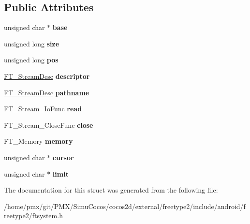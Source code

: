 \subsection*{Public Attributes}
\begin{DoxyCompactItemize}
\item 
\mbox{\label{structFT__StreamRec___a1ed28cf0a94f6cd68ac70b878c5d1e5b}} 
unsigned char $\ast$ {\bfseries base}
\item 
\mbox{\label{structFT__StreamRec___ab00e3cf802c950d0ca5a022a06953123}} 
unsigned long {\bfseries size}
\item 
\mbox{\label{structFT__StreamRec___a5bf82c2ff4554752edfeec442fba2f33}} 
unsigned long {\bfseries pos}
\item 
\mbox{\label{structFT__StreamRec___a361c44020eace21cc453b51852d8cc4f}} 
\hyperlink{unionFT__StreamDesc__}{F\+T\+\_\+\+Stream\+Desc} {\bfseries descriptor}
\item 
\mbox{\label{structFT__StreamRec___afd75c5de5ed78c484a200a7e97ef5a41}} 
\hyperlink{unionFT__StreamDesc__}{F\+T\+\_\+\+Stream\+Desc} {\bfseries pathname}
\item 
\mbox{\label{structFT__StreamRec___af724049d0258d4988c2b11c3a08b1b05}} 
F\+T\+\_\+\+Stream\+\_\+\+Io\+Func {\bfseries read}
\item 
\mbox{\label{structFT__StreamRec___a7d7c7a1d7de8f580d7ad66efe89defa9}} 
F\+T\+\_\+\+Stream\+\_\+\+Close\+Func {\bfseries close}
\item 
\mbox{\label{structFT__StreamRec___a51e2be0d80d70b532aae3face5461e7e}} 
F\+T\+\_\+\+Memory {\bfseries memory}
\item 
\mbox{\label{structFT__StreamRec___abecba2829abd4637cf8e115784201330}} 
unsigned char $\ast$ {\bfseries cursor}
\item 
\mbox{\label{structFT__StreamRec___ad1f97af7f3f4ca1eb358bdd2434009de}} 
unsigned char $\ast$ {\bfseries limit}
\end{DoxyCompactItemize}


The documentation for this struct was generated from the following file\+:\begin{DoxyCompactItemize}
\item 
/home/pmx/git/\+P\+M\+X/\+Simu\+Cocos/cocos2d/external/freetype2/include/android/freetype2/ftsystem.\+h\end{DoxyCompactItemize}
